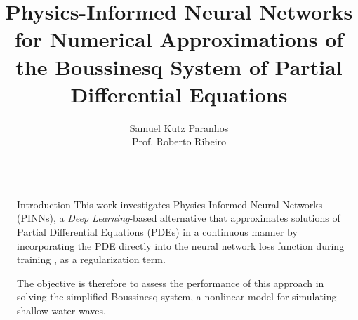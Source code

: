 \documentclass[final]{beamer}
\title{Physics-Informed Neural Networks for Numerical Approximations of the Boussinesq System of Partial Differential Equations}
\author{Samuel Kutz Paranhos \\[1ex] Prof. Roberto Ribeiro}
\institute{\normalsize PIBIC 2024}
\newlength{\sepwidth}
\newlength{\colwidth}
\newcommand{\separatorcolumn}{\begin{column}{\sepwidth}\end{column}}
\begin{document}
\begin{frame}[t]
\begin{columns}[t]
\separatorcolumn

\begin{column}{\colwidth}

  \begin{block}{Introduction}
    This work investigates \textcolor{UniBlue}{Physics-Informed Neural Networks (PINNs)}, a \textit{Deep Learning}-based alternative that approximates solutions of Partial Differential Equations (PDEs) in a continuous manner by incorporating the PDE directly into the neural network loss function during training \cite{raissi2017}, as a regularization term.

    The objective is therefore to assess the performance of this approach in solving the simplified Boussinesq system, a nonlinear model for simulating shallow water waves.
  \end{block}


\end{column}
\end{columns}
\end{frame}
\end{document}
